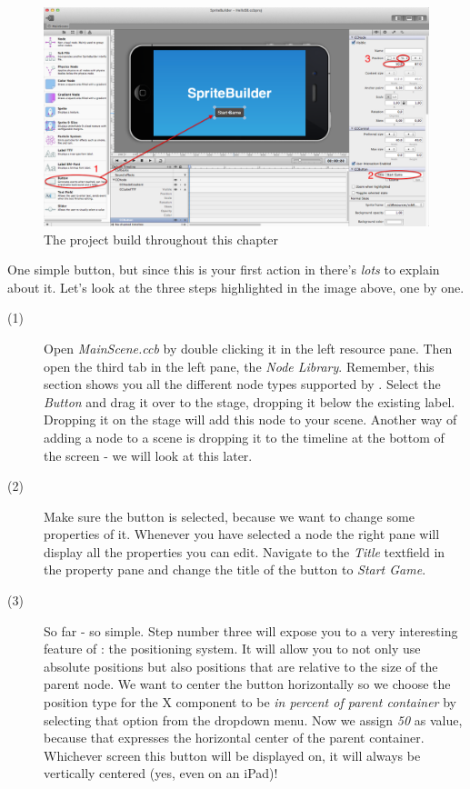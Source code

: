 \begin{figure}[H]
		\centering
		\includegraphics[width=0.9\linewidth]{images/firstproject/add_button.png}
		\caption{The project build throughout this chapter}
\end{figure}

One simple button, but since this is your first action in \SB{} there's
\textit{lots} to explain about it. Let's look at the three steps highlighted in
the image above, one by one.

\begin{description}
\item[(1)] Open \textit{MainScene.ccb} by double clicking it in the left
resource pane. Then open the third tab in the left pane, the \textit{Node
Library}. Remember, this section shows you all the different node types
supported by \SB{}. Select the \textit{Button} and drag it over to the stage,
dropping it below the existing label. Dropping it on the stage will add this
node to your scene. Another way of adding a node to a scene is dropping it to
the timeline at the bottom of the screen - we will look at this later.
\item[(2)] Make sure the button is selected, because we want to change some
properties of it. Whenever you have selected a node the right pane will display
all the properties you can edit. Navigate to the \textit{Title} textfield in the
property pane and change the title of the button to \textit{Start Game}.
\item[(3)] So far - so simple. Step number three will expose you to a very
interesting feature of \SB{}: the positioning system. It will allow you to not
only use absolute positions but also positions that are relative to the size of
the parent node. We want to center the button horizontally so we choose the
position type for the X component to be \textit{in percent of parent
container} by selecting that option from the dropdown menu. Now we assign
\textit{50} as value, because that expresses the horizontal center of the parent
container. Whichever screen this button will be displayed on, it will always be
vertically centered (yes, even on an iPad)!
\end{description}

